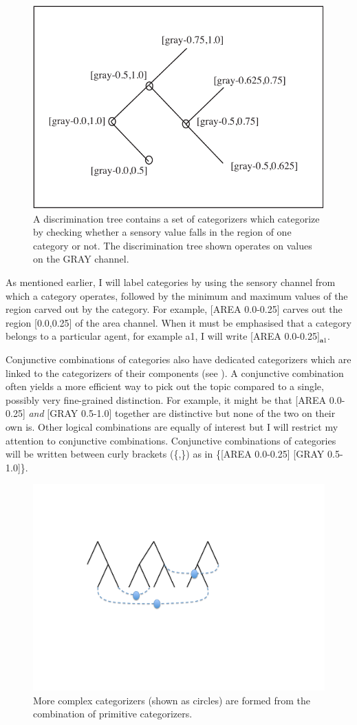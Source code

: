\begin{figure}[htbp]
  \centerline{\includegraphics[width=.65\textwidth]{chap4/figs/tree}}
\caption{\label{trees} A discrimination tree contains
a set of categorizers which categorize by checking whether
a sensory value falls in the region of one category or 
not. The discrimination tree shown operates on
values on the GRAY channel.}
\end{figure}

As mentioned earlier, I will label categories
by using the sensory channel from which a category operates, 
followed by the minimum and maximum values of the region
carved out by the category. For example, 
[AREA 0.0-0.25] carves out the region [0.0,0.25] of the 
area channel. When it must be emphasised that 
a category belongs to a particular agent, for 
example {\bfshape a1}, I will write [AREA 0.0-0.25]$_{\mathbf a1}$. 

Conjunctive combinations of categories also have
dedicated categorizers which are linked to 
the categorizers of their components (see 
). A conjunctive combination 
often yields a more efficient way to pick out 
the topic compared to a single, possibly very fine-grained
distinction. For example, it might be that 
[AREA 0.0-0.25] {\itshape and} [GRAY 0.5-1.0]
together are distinctive but none of the two on their
own is. Other logical combinations are equally of interest
but I will restrict my attention to conjunctive 
combinations. Conjunctive combinations of categories 
will be written between curly brackets (\{,\}) as in 
\{[AREA 0.0-0.25] [GRAY 0.5-1.0]\}. 

\begin{figure}[htbp]
  \centerline{\includegraphics[width=.65\textwidth]{chap4/figs/disnet}}
\caption{\label{disnet} More complex categorizers
(shown as circles) are formed from the combination
of primitive categorizers.}
\end{figure}

